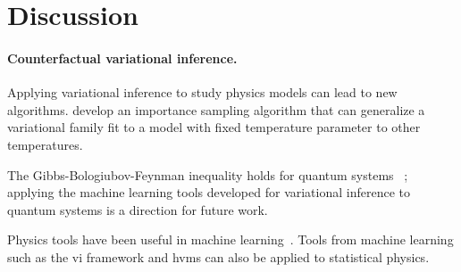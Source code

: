 
\section{Discussion}

\paragraph{Counterfactual variational inference.} Applying variational inference to study physics models can lead to new algorithms. \citet{nicoli2019comment} develop an importance sampling algorithm that can generalize a variational family fit to a model with fixed temperature parameter to other temperatures.

The Gibbs-Bologiubov-Feynman inequality holds for quantum systems~ \citep{feynman1972statistical}; applying the machine learning tools developed for variational inference to quantum systems is a direction for future work.

Physics tools have been useful in machine learning~\citep{bamler2017perturbative}. Tools from machine learning such as the \gls{vi} framework and \glspl{hvm} can also be applied to statistical physics.

